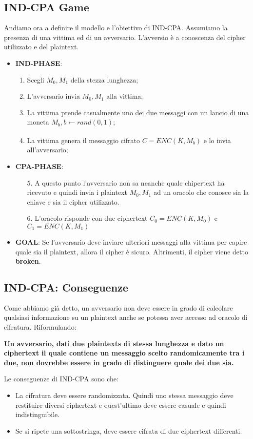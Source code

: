 \documentclass{article}
\theoremstyle{remark}
\begin{document}
\subsection{IND-CPA Game}
Andiamo ora a definire il modello e l'obiettivo di IND-CPA. Assumiamo la presenza di una vittima ed di un avversario. L'avversio è a conoscenza del cipher utilizzato e del plaintext.
\begin{itemize}
    \item \textbf{IND-PHASE}:
    \begin{enumerate}
    \item Scegli $M_0,M_1$ della stezza lunghezza;
    \item L'avversario invia $M_0,M_1$ alla vittima;
    \item La vittima prende casualmente uno dei due messaggi con un lancio di una moneta $M_b,b\xleftarrow[]{} rand(0,1)$;
    \item La vittima genera il messaggio cifrato $C = ENC(K,M_b)$ e lo invia all'avversario;
\end{enumerate}
    \item \textbf{CPA-PHASE}:
    \begin{enumerate}
        \item[5.] A questo punto l'avversario non sa neanche quale chipertext ha ricevuto e quindi invia i plaintext $M_0,M_1$ ad un oracolo che conosce sia la chiave e sia il cipher utilizzato.
        \item[6.] L'oracolo risponde con due ciphertext $C_0 = ENC(K,M_0)$ e $C_1 = ENC(K,M_1)$
    \end{enumerate}
    \item \textbf{GOAL}: Se l'avversario deve inviare ulteriori messaggi alla vittima per capire quale sia il plaintext, allora il cipher è sicuro. Altrimenti, il cipher viene detto \textbf{broken}.
\end{itemize}
\subsection{IND-CPA: Conseguenze}
Come abbiamo già detto, un avversario non deve essere in grado di calcolare qualsiasi informazione su un plaintext anche se potessa aver accesso ad oracolo di cifratura. Riformulando:
\begin{center}
    \textbf{Un avversario, dati due plaintexts di stessa lunghezza e dato un ciphertext il quale contiene un messaggio scelto randomicamente tra i due, non dovrebbe essere in grado di distinguere quale dei due sia.}
\end{center}
Le conseguenze di IND-CPA sono che:
\begin{itemize}
    \item La cifratura deve essere randomizzata. Quindi uno stessa messaggio deve restituire diversi ciphertext e quest'ultimo deve essere casuale e quindi indistinguibile.
    \item Se si ripete una sottostringa, deve essere cifrata di due ciphertext differenti.
\end{itemize}
\end{document}
